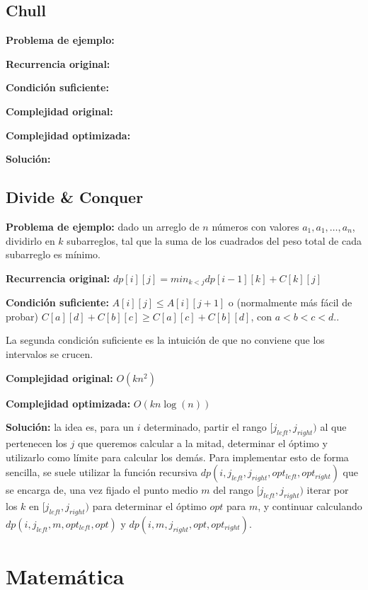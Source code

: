 \subsection{Chull}
{
    \textbf{Problema de ejemplo:} 

    \textbf{Recurrencia original:}

    \textbf{Condición suficiente:} 

    \textbf{Complejidad original:} 

    \textbf{Complejidad optimizada:} 

    \textbf{Solución:} 
}
\subsection{Divide \& Conquer}
{
    \textbf{Problema de ejemplo:} dado un arreglo de $n$ números con valores $a_1, a_1, \dots, a_n$, dividirlo
    en $k$ subarreglos, tal que la suma de los cuadrados del peso total de cada subarreglo es mínimo.

    \textbf{Recurrencia original:} $dp[i][j] = min_{k < j}{dp[i - 1][k] + C[k][j]}$ 

    \textbf{Condición suficiente:} $ A[i][j] \leq A[i][j + 1] $ o (normalmente más fácil de probar) 
    $ C[a][d] + C[b][c] \geq C[a][c] + C[b][d]$, con $a < b < c < d. $.

    La segunda condición suficiente es la intuición de que no conviene que los intervalos se crucen.

    \textbf{Complejidad original:} $O(kn^2)$

    \textbf{Complejidad optimizada:} $O(kn\log(n))$

    \textbf{Solución:} la idea es, para un $i$ determinado, partir el rango $[j_{left}, j_{right})$ al que pertenecen 
    los $j$ que queremos calcular a la mitad, determinar el óptimo y utilizarlo como límite para calcular los demás.
    Para implementar esto de forma sencilla, se suele utilizar la función recursiva $dp(i, j_{left}, j_{right}, opt_{left}, opt_{right})$
    que se encarga de, una vez fijado el punto medio $m$ del rango $[j_{left}, j_{right})$ iterar por los $k$ en $[j_{left}, j_{right})$ 
    para determinar el óptimo $opt$ para $m$, y continuar calculando $dp(i, j_{left}, m, opt_{left}, opt)$ y 
    $dp(i, m, j_{right}, opt, opt_{right})$.
}


\section{Matemática}%
